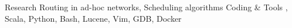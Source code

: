 
\begin{cvskills}

  \cvskill
    {Research} %
    {Routing in ad-hoc networks, Scheduling algorithms} %
  \cvskill
    {Coding \& Tools} %
    {, Scala, Python, Bash, Lucene, Vim, GDB, Docker} %



\end{cvskills}
